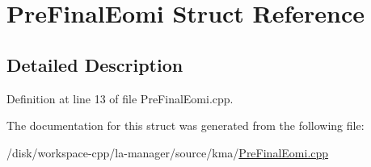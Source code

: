\hypertarget{structPreFinalEomi}{
\section{PreFinalEomi Struct Reference}
\label{structPreFinalEomi}
}


\subsection{Detailed Description}


Definition at line 13 of file PreFinalEomi.cpp.

The documentation for this struct was generated from the following file:\begin{CompactItemize}
\item 
/disk/workspace-cpp/la-manager/source/kma/\hyperlink{PreFinalEomi_8cpp}{PreFinalEomi.cpp}\end{CompactItemize}
